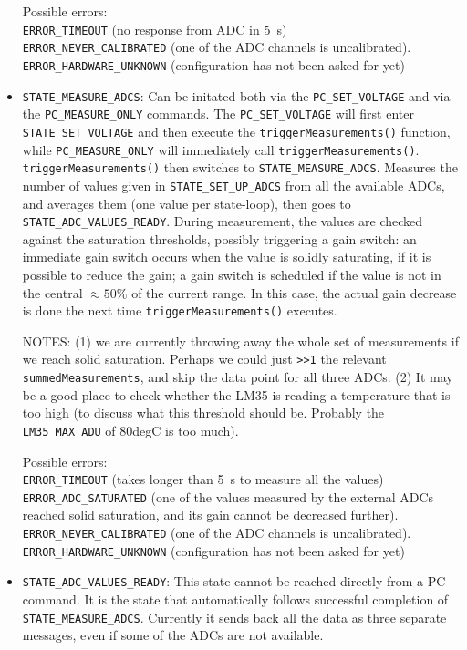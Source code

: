 \documentclass[11pt,a4paper,english]{article}
\begin{document}
\begin{itemize}
	Possible errors:\\\texttt{ERROR\_TIMEOUT} (no response from ADC in 5~s)\\\texttt{ERROR\_NEVER\_CALIBRATED} (one of the ADC channels is uncalibrated).\\\texttt{ERROR\_HARDWARE\_UNKNOWN} (configuration has not been asked for yet)

\item \texttt{STATE\_MEASURE\_ADCS}: Can be initated both via the \texttt{PC\_SET\_VOLTAGE} and via the \texttt{PC\_MEASURE\_ONLY} commands. The \texttt{PC\_SET\_VOLTAGE} will first enter \texttt{STATE\_SET\_VOLTAGE} and then execute the \texttt{triggerMeasurements()} function, while \texttt{PC\_MEASURE\_ONLY} will immediately call \texttt{triggerMeasurements()}. \texttt{triggerMeasurements()} then switches to \texttt{STATE\_MEASURE\_ADCS}. Measures the number of values given in \texttt{STATE\_SET\_UP\_ADCS} from all the available ADCs, and averages them (one value per state-loop), then goes to \texttt{STATE\_ADC\_VALUES\_READY}. During measurement, the values are checked against the saturation thresholds, possibly triggering a gain switch: an immediate gain switch occurs when the value is solidly saturating, if it is possible to reduce the gain; a gain switch is scheduled if the value is not in the central $\approx50\%$ of the current range. In this case, the actual gain decrease is done the next time \texttt{triggerMeasurements()} executes.

NOTES: (1) we are currently throwing away the whole set of measurements if we reach solid saturation. Perhaps we could just \texttt{>>1} the relevant \texttt{summedMeasurements}, and skip the data point for all three ADCs. (2) It may be a good place to check whether the LM35 is reading a temperature that is too high (to discuss what this threshold should be. Probably the \texttt{LM35\_MAX\_ADU} of 80degC is too much).

	Possible errors:\\\texttt{ERROR\_TIMEOUT} (takes longer than 5~s to measure all the values)\\\texttt{ERROR\_ADC\_SATURATED} (one of the values measured by the external ADCs reached solid saturation, and its gain cannot be decreased further). \\\texttt{ERROR\_NEVER\_CALIBRATED} (one of the ADC channels is uncalibrated).\\\texttt{ERROR\_HARDWARE\_UNKNOWN} (configuration has not been asked for yet)

\item \texttt{STATE\_ADC\_VALUES\_READY}: This state cannot be reached directly from a PC command. It is the state that automatically follows successful completion of \texttt{STATE\_MEASURE\_ADCS}. Currently it sends back all the data as three separate messages, even if some of the ADCs are not available.


\end{itemize}
\end{document}
